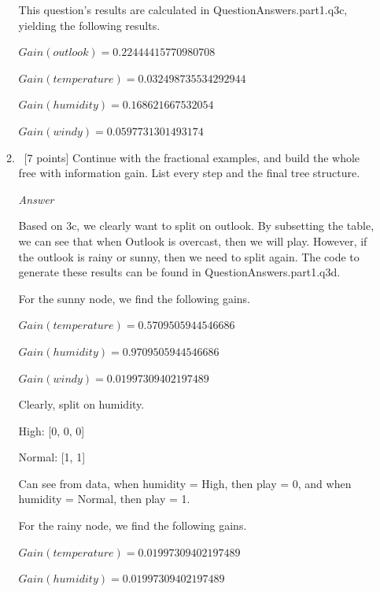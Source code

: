 \documentclass[12pt, fullpage,letterpaper]{article}
\begin{document}
\begin{enumerate}
\begin{enumerate}
\vspace{5mm}

This question's results are calculated in QuestionAnswers.part1.q3c, yielding the following results.

\vspace{5mm}

$Gain(outlook)=0.22444415770980708$

$Gain(temperature)=0.032498735534292944$

$Gain(humidity)=0.168621667532054$

$Gain(windy)=0.0597731301493174$

\item~[7 points] Continue with the fractional examples, and build the whole free with information gain. List every step and the final tree structure.

\emph{Answer}

Based on 3c, we clearly want to split on outlook. By subsetting the table, we can see that when Outlook is overcast, then we will play. However, if the outlook is rainy or sunny, then we need to split again. The code to generate these results can be found in QuestionAnswers.part1.q3d.

\vspace{5mm}

For the sunny node, we find the following gains.

$Gain(temperature)=0.5709505944546686$

$Gain(humidity)=0.9709505944546686$

$Gain(windy)=0.01997309402197489$

\vspace{5mm}

Clearly, split on humidity.

\vspace{5mm}

High: [0, 0, 0]

Normal: [1, 1]

\vspace{5mm}

Can see from data, when humidity = High, then play = 0, and when humidity = Normal, then play = 1.

\vspace{5mm}

For the rainy node, we find the following gains.

$Gain(temperature)=0.01997309402197489$

$Gain(humidity)=0.01997309402197489$


\end{enumerate}
\end{enumerate}
\end{document}
